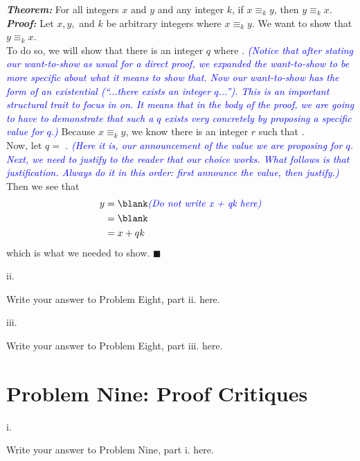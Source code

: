 \documentclass{article}
\renewcommand{\(}{\left(}
\renewcommand{\)}{\right)}
\renewcommand\qedsymbol{$\blacksquare$}
\renewcommand{\emph}[1]{\textit{\textbf{#1}}}
\newcommand{\annotate}[1]{\textit{\textcolor{blue}{#1}}}
\theoremstyle{plain}
\theoremstyle{plain}
\theoremstyle{definition}
\begin{document}
\begin{center}
\begin{boxedminipage}{0.9\textwidth}
\emph{Theorem:} For all integers $x$ and $y$ and any integer $k$, if $x \equiv_{k} y$, then $y \equiv_{k} x$. \\
\emph{Proof: } Let $x, y, $ and $k$ be arbitrary integers where $x \equiv_{k} y$. We want to show that $y \equiv_{k} x$.\\
To do so, we will show that there is an integer $q$ where \blank. \annotate{(Notice that after stating our want-to-show as usual for a direct proof, we expanded the want-to-show to be more specific about what it means to show that. Now our want-to-show has the form of an existential (``...there exists an integer $q$...''). This is an important structural trait to focus in on. It means that in the body of the proof, we are going to have to demonstrate that such a $q$ exists very concretely by proposing a specific value for $q$.)}
Because $x \equiv_{k} y$, we know there is an integer $r$ such that \blank.\\
Now, let $q = $ \blank. \annotate{(Here it is, our announcement of the value we are proposing for $q$. Next, we need to justify to the reader that our choice works. What follows is that justification. Always do it in this order: first announce the value, then justify.)} Then we see that
\begin{equation*}
\begin{split}
y &= \blank \annotate{(Do not write x + qk here)}\\
&= \blank \\
&= x + qk
\end{split}
\end{equation*}
which is what we needed to show. \qedsymbol
\end{boxedminipage}
\end{center}

ii.
\begin{shaded}
Write your answer to Problem Eight, part ii. here.
\end{shaded}

iii.
\begin{shaded}
Write your answer to Problem Eight, part iii. here.
\end{shaded}

\newpage

\section*{Problem Nine: Proof Critiques}
i.
\begin{shaded}
Write your answer to Problem Nine, part i. here.
\end{shaded}
\end{document}
